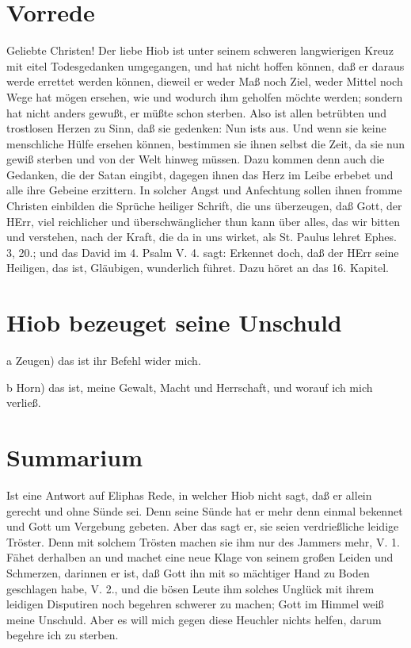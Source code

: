\section{Vorrede}

Geliebte Christen! Der liebe Hiob ist unter seinem schweren langwierigen Kreuz mit eitel Todesgedanken umgegangen, und hat nicht hoffen können, daß er daraus werde errettet werden können, dieweil er weder Maß noch Ziel, weder Mittel noch Wege hat mögen ersehen, wie und wodurch ihm geholfen möchte werden; sondern hat nicht anders gewußt, er müßte schon sterben. Also ist allen betrübten und trostlosen Herzen zu Sinn, daß sie gedenken: Nun ists aus. Und wenn sie keine menschliche Hülfe ersehen können, bestimmen sie ihnen selbst die Zeit, da sie nun gewiß sterben und von der Welt hinweg müssen. Dazu kommen denn auch die Gedanken, die der Satan eingibt, dagegen ihnen das Herz im Leibe erbebet und alle ihre Gebeine erzittern. In solcher Angst und Anfechtung sollen ihnen fromme Christen einbilden die Sprüche heiliger Schrift, die uns überzeugen, daß Gott, der HErr, viel reichlicher und überschwänglicher thun kann über alles, das wir bitten und verstehen, nach der Kraft, die da in uns wirket, als St. Paulus lehret Ephes. 3, 20.; und das David im 4. Psalm V. 4. sagt: Erkennet doch, daß der HErr seine Heiligen, das ist, Gläubigen, wunderlich führet. Dazu höret an das 16. Kapitel.

\section{Hiob bezeuget seine Unschuld}

a Zeugen) das ist ihr Befehl wider mich.

b Horn) das ist, meine Gewalt, Macht und Herrschaft, und worauf ich mich verließ.

\section{Summarium}

Ist eine Antwort auf Eliphas Rede, in welcher Hiob nicht sagt, daß er allein gerecht und ohne Sünde sei. Denn seine Sünde hat er mehr denn einmal bekennet und Gott um Vergebung gebeten. Aber das sagt er, sie seien verdrießliche leidige Tröster. Denn mit solchem Trösten machen sie ihm nur des Jammers mehr, V. 1. Fähet derhalben an und machet eine neue Klage von seinem großen Leiden und Schmerzen, darinnen er ist, daß Gott ihn mit so mächtiger Hand zu Boden geschlagen habe, V. 2., und die bösen Leute ihm solches Unglück mit ihrem leidigen Disputiren noch begehren schwerer zu machen; Gott im Himmel weiß meine Unschuld. Aber es will mich gegen diese Heuchler nichts helfen, darum begehre ich zu sterben.

